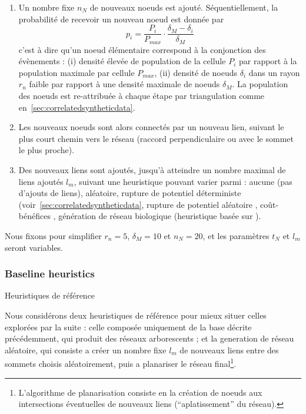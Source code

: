 \begin{enumerate}
	\item Un nombre fixe $n_N$ de nouveaux noeuds est ajouté. Séquentiellement, la probabilité de recevoir un nouveau noeud est donnée par
\[
p_i = \frac{P_i}{P_{max}} \cdot \frac{\delta_M - \delta_i}{\delta_M}
\]
c'est à dire qu'un noeud élémentaire correspond à la conjonction des évènements : (i) densité élevée de population de la cellule $P_i$ par rapport à la population maximale par cellule $P_{max}$, (ii) densité de noeuds $\delta_i$ dans un rayon $r_n$ faible par rapport à une densité maximale de noeuds $\delta_M$. La population des noeuds est re-attribuée à chaque étape par triangulation comme en~\ref{sec:correlatedsyntheticdata}.
	\item Les nouveaux noeuds sont alors connectés par un nouveau lien, suivant le plus court chemin vers le réseau (raccord perpendiculaire ou avec le sommet le plus proche).
	\item Des nouveaux liens sont ajoutés, jusqu'à atteindre un nombre maximal de liens ajoutés $l_{m}$, suivant une heuristique pouvant varier parmi :  aucune (pas d'ajouts de liens), aléatoire, rupture de potentiel déterministe (voir~\ref{sec:correlatedsyntheticdata}, rupture de potentiel aléatoire \cite{schmitt2014modelisation}, coût-bénéfices \cite{louf2013emergence}, génération de réseau biologique (heuristique basée sur \cite{tero2010rules}).
\end{enumerate}


Nous fixons pour simplifier $r_n = 5$, $\delta_M = 10$ et $n_N=20$, et les paramètres $t_N$ et $l_m$ seront variables.


\subsubsection{Baseline heuristics}{Heuristiques de référence}

Nous considérons deux heuristiques de référence pour mieux situer celles explorées par la suite : celle composée uniquement de la base décrite précédemment, qui produit des réseaux arborescents ; et la generation de réseau aléatoire, qui consiste a créer un nombre fixe $l_m$ de nouveaux liens entre des sommets choisis aléatoirement, puis a planariser le réseau final\footnote{L'algorithme de planarisation consiste en la création de noeuds aux intersections éventuelles de nouveaux liens (``aplatissement'' du réseau).}.



